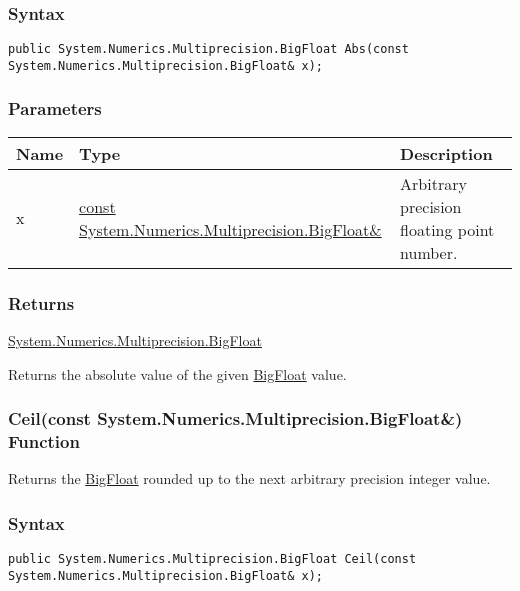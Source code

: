 \documentclass[a4paper,oneside,11.000000pt]{book}
\begin{document}
\subsubsection*{Syntax}
\texttt{public System.Numerics.Multiprecision.BigFloat Abs(const System.Numerics.Multiprecision.BigFloat\& x);}
\subsubsection*{Parameters}
\begin{flushleft}
\begin{supertabular}[l]{!{\raggedright}p{1.30721cm}!{\raggedright}p{8.55945cm}!{\raggedright}p{4.93333cm}}
\textbf{Name}
& \textbf{Type}
& \textbf{Description}
\\
\hline
x
& \hyperlink{System.Numerics.Multiprecision.BigFloat}{const System.\-Numerics.\-Multiprecision.\-BigFloat\&\-}
& Arbitrary precision floating point number.

\\
\end{supertabular}

\end{flushleft}
\subsubsection*{Returns}
\hyperlink{System.Numerics.Multiprecision.BigFloat}{System.\-Numerics.\-Multiprecision.\-BigFloat}
\begin{flushleft}
Returns the absolute value of the given \hyperlink{System.Numerics.Multiprecision.BigFloat}{BigFloat} value.

\end{flushleft}
\clearpage

\hypertarget{System.Numerics.Multiprecision.Ceil.C.R.System.Numerics.Multiprecision.BigFloat}{\subsubsection*{Ceil(const System.Numerics.Multiprecision.BigFloat\&) Function}}
\begin{flushleft}
Returns the \hyperlink{System.Numerics.Multiprecision.BigFloat}{BigFloat} rounded up to the next arbitrary precision integer value.

\end{flushleft}
\subsubsection*{Syntax}
\texttt{public System.Numerics.Multiprecision.BigFloat Ceil(const System.Numerics.Multiprecision.BigFloat\& x);}
\end{document}
